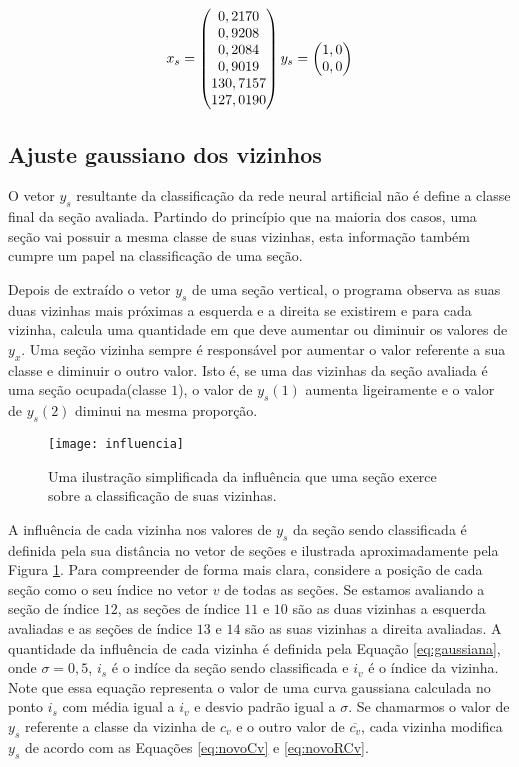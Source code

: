 \begin{equation}
\centering
	x_s = \begin{pmatrix}
	0,2170\\0,9208\\0,2084\\0,9019\\130,7157\\127,0190
	\end{pmatrix}
	y_s = \begin{pmatrix}
	1,0\\0,0
	\end{pmatrix}
\centering
\label{eq:vetoresRede}
\end{equation}


\subsection{Ajuste gaussiano dos vizinhos}

O vetor $y_s$ resultante da classificação da rede neural artificial não é define a classe final da seção avaliada. Partindo do princípio que na maioria dos casos, uma seção vai possuir a mesma classe de suas vizinhas, esta informação também cumpre um papel na classificação de uma seção. 

Depois de extraído o vetor $y_s$ de uma seção vertical, o programa observa as suas duas vizinhas mais próximas a esquerda e a direita se existirem e para cada vizinha, calcula uma quantidade em que deve aumentar ou diminuir os valores de $y_x$. Uma seção vizinha sempre é responsável por aumentar o valor referente a sua classe e diminuir o outro valor. Isto é, se uma das vizinhas da seção avaliada é uma seção ocupada(classe $1$), o valor de $y_s(1)$ aumenta ligeiramente e o valor de $y_s(2)$ diminui na mesma proporção.

\begin{figure}
\centering
\texttt{[image: influencia]}
\caption{Uma ilustração simplificada da influência que uma seção exerce sobre a classificação de suas vizinhas.}
\label{fig:influencia}
\centering
\end{figure}


A influência de cada vizinha nos valores de $y_s$ da seção sendo classificada é definida pela sua distância no vetor de seções e ilustrada aproximadamente pela Figura \ref{fig:influencia}. Para compreender de forma mais clara, considere a posição de cada seção como o seu índice no vetor $v$ de todas as seções. Se estamos avaliando a seção de índice $12$, as seções de índice $11$ e $10$ são as duas vizinhas a esquerda avaliadas e as seções de índice $13$ e $14$ são as suas vizinhas a direita avaliadas. A quantidade da influência de cada vizinha é definida pela Equação \ref{eq:gaussiana}, onde $\sigma = 0,5$, $i_s$ é o indíce da seção sendo classificada e $i_v$ é o índice da vizinha. Note que essa equação representa o valor de uma curva gaussiana calculada no ponto $i_s$ com média igual a $i_v$ e desvio padrão igual a $\sigma$. Se chamarmos o valor de $y_s$ referente a classe da vizinha de $c_v$ e o outro valor de $\overline{c_v}$, cada vizinha modifica $y_s$ de acordo com as Equações \ref{eq:novoCv} e \ref{eq:novoRCv}.


